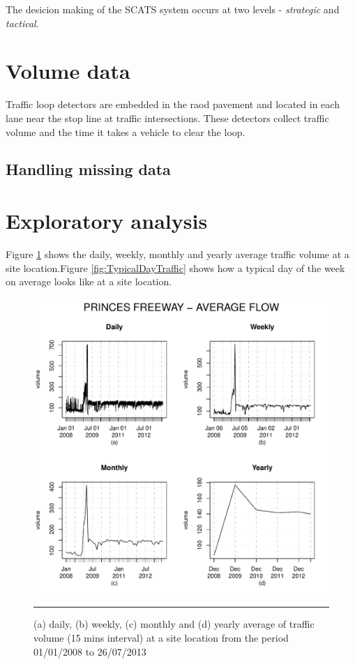 The desicion making of the SCATS system occurs at two levels - \emph{strategic} and \emph{tactical}.


\section{Volume data}
Traffic loop detectors are embedded in the raod pavement and located in each lane near the stop
line at traffic intersections. These detectors collect traffic volume and the time it takes a
vehicle to clear the loop.


\subsection{Handling missing data}


\section{Exploratory analysis}
Figure \ref{fig:AverageTrafficVolume} shows the daily, weekly, monthly and yearly average traffic
volume at a site location.Figure \ref{fig:TypicalDayTraffic} shows how a typical day of the week
on average looks like at a site location.

\begin{figure}[htbp]
  \centering
    \includegraphics[width=\textwidth,height=\textheight,keepaspectratio]{Figures/averages.pdf}
    \rule{35em}{0.5pt}
  \caption[Average Traffic Volume]{(a) daily, (b) weekly, (c) monthly and (d) yearly average of
  traffic volume (15 mins interval) at a site location from the period 01/01/2008 to 26/07/2013}
  \label{fig:AverageTrafficVolume}
\end{figure}

